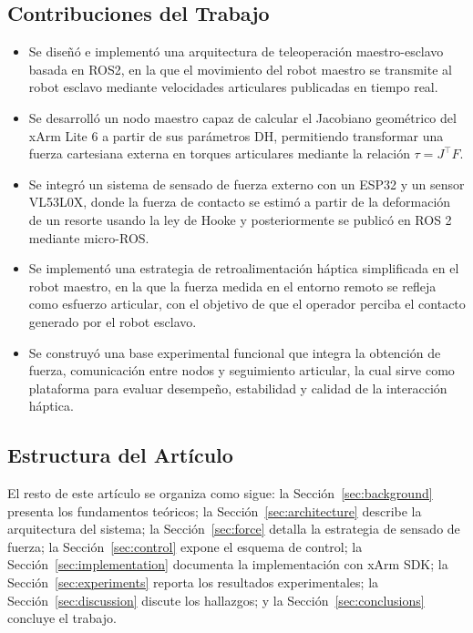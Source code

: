 \documentclass[journal,10pt,twoside]{IEEEtran}
\begin{document}
\subsection{Contribuciones del Trabajo}
\begin{itemize}
    \item Se diseñó e implementó una arquitectura de teleoperación maestro-esclavo basada en ROS2, en la que el movimiento del robot maestro se transmite al robot esclavo mediante velocidades articulares publicadas en tiempo real.

    \item Se desarrolló un nodo maestro capaz de calcular el Jacobiano geométrico del xArm Lite 6 a partir de sus parámetros DH, permitiendo transformar una fuerza cartesiana externa en torques articulares mediante la relación $\tau = J^{\top}F$.

    \item Se integró un sistema de sensado de fuerza externo con un ESP32 y un sensor VL53L0X, donde la fuerza de contacto se estimó a partir de la deformación de un resorte usando la ley de Hooke y posteriormente se publicó en ROS 2 mediante micro-ROS.

    \item Se implementó una estrategia de retroalimentación háptica simplificada en el robot maestro, en la que la fuerza medida en el entorno remoto se refleja como esfuerzo articular, con el objetivo de que el operador perciba el contacto generado por el robot esclavo.

    \item Se construyó una base experimental funcional que integra la obtención de fuerza, comunicación entre nodos y seguimiento articular, la cual sirve como plataforma para evaluar desempeño, estabilidad y calidad de la interacción háptica.
\end{itemize}

\subsection{Estructura del Artículo}
El resto de este artículo se organiza como sigue:
la Sección~\ref{sec:background} presenta los fundamentos teóricos;
la Sección~\ref{sec:architecture} describe la arquitectura del sistema;
la Sección~\ref{sec:force} detalla la estrategia de sensado de fuerza;
la Sección~\ref{sec:control} expone el esquema de control;
la Sección~\ref{sec:implementation} documenta la implementación con xArm SDK;
la Sección~\ref{sec:experiments} reporta los resultados experimentales;
la Sección~\ref{sec:discussion} discute los hallazgos;
y la Sección~\ref{sec:conclusions} concluye el trabajo.
\end{document}
